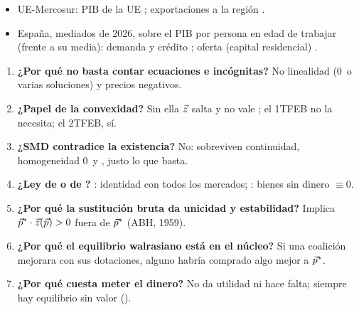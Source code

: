 \documentclass{article}
\begin{document}
\begin{columnas}
\anexorepaso
{}
\begin{itemize}
\item UE-Mercosur: PIB de la UE ; exportaciones a la región .
\item España, mediados de 2026, sobre el PIB por persona en edad de trabajar (frente a su media): demanda y crédito ; oferta (capital residencial) .
\end{itemize}


\begin{enumerate}
\item \textbf{¿Por qué no basta contar ecuaciones e incógnitas?} No linealidad (0~o varias soluciones) y precios negativos.
\item \textbf{¿Papel de la convexidad?} Sin ella $\vec{z}$ salta y no vale ; el 1TFEB no la necesita; el 2TFEB, sí.
\item \textbf{¿SMD contradice la existencia?} No: sobreviven continuidad, homogeneidad 0~y , justo lo que basta.
\item \textbf{¿Ley de  o de ?} : identidad con todos los mercados; : bienes sin dinero $\equiv0$.
\item \textbf{¿Por qué la sustitución bruta da unicidad y estabilidad?} Implica $\vec{p}^*\cdot\vec{z}(\vec{p})>0$ fuera de $\vec{p}^*$ (ABH, 1959).
\item \textbf{¿Por qué el equilibrio walrasiano está en el núcleo?} Si una coalición mejorara con sus dotaciones, alguno habría comprado algo mejor a $\vec{p}^*$.
\item \textbf{¿Por qué cuesta meter el dinero?} No da utilidad ni hace falta; siempre hay equilibrio sin valor ().
\end{enumerate}


\end{columnas}
\end{document}
